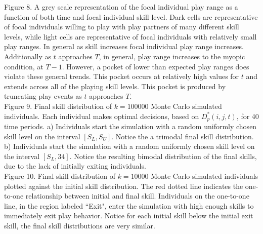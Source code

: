 \documentclass[12pt, letterpaper, fleqn]{article}
\begin{document}
%
%

%
Figure 8.
%
A grey scale representation of the focal individual play range as a function of both time and focal individual skill level. 
%
Dark cells are representative of focal individuals willing to play with play partners of many different skill levels, while light cells are representative of focal individuals with relatively small play ranges.
%
In general as skill increases focal individual play range increases. Additionally as $t$ approaches $T$, in general, play range increases to the myopic condition, at $T-1$. 
%
However, a pocket of lower than expected play ranges does violate these general trends. 
%
This pocket occurs at relatively high values for $t$ and extends across all of the playing skill levels.
%
This pocket is produced by truncating play events as $t$ approaches $T$.
\\

%
%

%
Figure 9.
Final skill distribution of $k=100000$ Monte Carlo simulated individuals. 
%
Each individual makes optimal decisions, based on $D_p^*(i,j,t)$, for 40 time periods.
%
a) Individuals start the simulation with a random uniformly chosen skill level on the interval $[S_L,S_U]$.
%
Notice the a trimodal final skill distribution. 
%
b) Individuals start the simulation with a random uniformly chosen skill level on the interval $[S_L, 34]$. 
%
Notice the resulting bimodal distribution of the final skills, due to the lack of initially exiting individuals. 
\\

%
%

%
Figure 10.
Final skill distribution of $k=10000$ Monte Carlo simulated individuals plotted against the initial skill distribution. 
%
The red dotted line indicates the one-to-one relationship between initial and final skill. 
%
Individuals on the one-to-one line, in the region labeled ``Exit", enter the simulation with high enough skills to immediately exit play behavior. 
%
Notice for each initial skill below the initial exit skill, the final skill distributions are very similar. %
\end{document}
